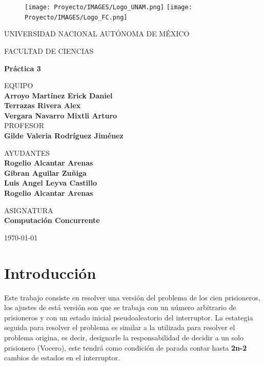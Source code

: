 \documentclass[10pt,letterpaper]{article}
\begin{document}
\thispagestyle{empty}
	
	\begin{figure}[ht]
			\texttt{[image: Proyecto/IMAGES/Logo\_UNAM.png]}
			\label{EscudoUNAM}
	   \endminipage
			\texttt{[image: Proyecto/IMAGES/Logo\_FC.png]}
			\label{EscudoFC}
		\endminipage
	\end{figure}
	
	\begin{center}
	\vspace{0.8cm}
	\LARGE
	UNIVERSIDAD NACIONAL AUTÓNOMA DE MÉXICO 
	
	\vspace{0.8cm}
	\LARGE
	FACULTAD DE CIENCIAS
	
	\vspace{.5cm}	
	\Large
	\textbf{Práctica 3}

	\vspace{.7cm}
	\normalsize	
	EQUIPO \\
	\vspace{.3cm}
	\large
	\textbf{Arroyo Martínez Erick Daniel} \\ 
    \textbf{Terrazas Rivera Alex}\\
    \textbf{Vergara Navarro Mixtli Arturo}
	\vspace{.7cm}\\
	\normalsize	
	PROFESOR \\
	\vspace{.3cm}
	\large
	\textbf{Gilde Valeria Rodríguez Jiménez}

    \vspace{.7cm}
	\normalsize	
	AYUDANTES \\
	\vspace{.3cm}
	\large
	\textbf{Rogelio Alcantar Arenas}\\
    \textbf{Gibran Aguilar Zuñiga}\\
    \textbf{Luis Angel Leyva Castillo}\\
    \textbf{Rogelio Alcantar Arenas}
	
	\vspace{.7cm}
	\normalsize	
	ASIGNATURA \\
	\vspace{.3cm}
	\large
	\textbf{Computación Concurrente}
	
	\vspace{.2cm}
	\today
	\end{center}
	\newpage

\section*{Introducción}
Este trabajo consiste en resolver una versión del problema de los cien prisioneros, los ajustes de está versión son que se trabaja con un número arbitrario de prisioneros y con un estado inicial pseudoaleatorio del interruptor. La estategia seguida para resolver el problema es similar a la utilizada para resolver el problema origina, es decir, designarle la responsabilidad de decidir a un solo prisionero (Vocero), este tendrá como condición de parada contar hasta \textbf{2n-2} cambios de estados en el interruptor.
\end{document}
